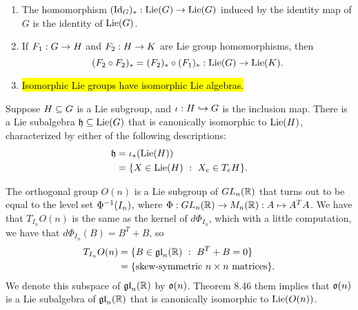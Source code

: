 \begin{prop}\nl
\begin{enumerate}
    \item The homomorphism $(\text{Id}_G)_*:\text{Lie}(G)\rightarrow \text{Lie}(G)$ induced by the identity map of $G$ is the identity of $\text{Lie}(G)$.
    \item If $F_1:G\rightarrow H$ and $F_2:H\rightarrow K$ are Lie group homomorphisms, then
    \[(F_2\circ F_2)_* = (F_2)_*\circ (F_1)_*:\text{Lie}(G)\rightarrow \text{Lie}(K).\]
    \item \hl{Isomorphic Lie groups have isomorphic Lie algebras.}
\end{enumerate}
\end{prop}

\begin{thm}
Suppose $H\subseteq G$ is a Lie subgroup, and $\iota:H\hookrightarrow G$ is the inclusion map. There is a Lie subalgebra $\mathfrak{h}\subseteq\text{Lie}(G)$ that is canonically isomorphic to $\text{Lie}(H)$, characterized by either of the following descriptions:
\begin{align*}
    \mathfrak{h} &= \iota_*(\text{Lie}(H))\\
    &= \{X\in \text{Lie}(H)\ :\ X_e\in T_eH\}.
\end{align*}
\end{thm}

\begin{ex}
The orthogonal group $O(n)$ is a Lie subgroup of $GL_n(\mathbb{R})$ that turns out to be equal to the level set $\Phi^{-1}(I_n)$, where $\Phi:GL_n(\mathbb{R})\rightarrow M_n(\mathbb{R}):A\mapsto A^T A$. We have that $T_{I_n}O(n)$ is the same as the kernel of $d\Phi_{I_n}$, which with a little computation, we have that $d\Phi_{I_n}(B) = B^T + B$, so
\begin{align*}
    T_{I_n}O(n) &= \{B\in \mathfrak{gl}_n(\mathbb{R})\ :\ B^T + B = 0\}\\
    &= \{\text{skew-symmetric $n\times n$ matrices}\}.
\end{align*}
We denote this subspace of $\mathfrak{gl}_n(\mathbb{R})$ by $\mathfrak{o}(n)$. Theorem 8.46 them implies that $\mathfrak{o}(n)$ is a Lie subalgebra of $\mathfrak{gl}_n(\mathbb{R})$ that is canonically isomorphic to $\text{Lie}(O(n))$.
\end{ex}
